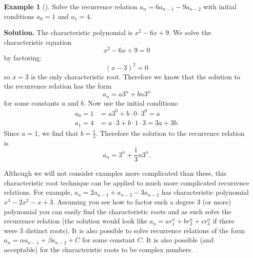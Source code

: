\documentclass[10pt,]{book}
\theoremstyle{plain}
\theoremstyle{definition}
\theoremstyle{definition}
\newtheorem{example}[theorem]{Example}
\theoremstyle{definition}
\theoremstyle{definition}
\numberwithin{equation}{chapter}
\newcommand{\amp}{&}
\begin{document}
\begin{example}[]\label{example-24}
\hypertarget{p-339}{}%
Solve the recurrence relation \(a_n = 6a_{n-1} - 9a_{n-2}\) with initial conditions \(a_0 = 1\) and \(a_1 = 4\).%
\par\smallskip%
\noindent\textbf{Solution.}\hypertarget{solution-38}{}\quad%
\hypertarget{p-340}{}%
The characteristic polynomial is \(x^2 - 6x + 9\). We solve the characteristic equation%
\begin{equation*}
x^2 - 6x + 9 = 0
\end{equation*}
by factoring:%
\begin{equation*}
(x - 3)^2 = 0
\end{equation*}
so \(x =3\) is the only characteristic root. Therefore we know that the solution to the recurrence relation has the form%
\begin{equation*}
a_n = a 3^n + bn3^n
\end{equation*}
for some constants \(a\) and \(b\). Now use the initial conditions:%
\begin{align*}
a_0 = 1 \amp = a 3^0 + b\cdot 0 \cdot 3^0 = a\\
a_1 = 4 \amp = a\cdot 3 + b\cdot 1 \cdot3 = 3a + 3b.
\end{align*}
Since \(a = 1\), we find that \(b = \frac{1}{3}\). Therefore the solution to the recurrence relation is%
\begin{equation*}
a_n = 3^n + \frac{1}{3}n3^n.
\end{equation*}
%
\end{example}
\hypertarget{p-341}{}%
Although we will not consider examples more complicated than these, this characteristic root technique can be applied to much more complicated recurrence relations. For example, \(a_n = 2a_{n-1} + a_{n-2} - 3a_{n-3}\) has characteristic polynomial \(x^3 - 2 x^2 - x + 3\). Assuming you see how to factor such a degree 3 (or more) polynomial you can easily find the characteristic roots and as such solve the recurrence relation (the solution would look like \(a_n = ar_1^n + br_2^n + cr_3^n\) if there were 3 distinct roots). It is also possible to solve recurrence relations of the form \(a_n = \alpha a_{n-1} + \beta a_{n-2} + C\) for some constant \(C\). It is also possible (and acceptable) for the characteristic roots to be complex numbers.%
\typeout{************************************************}
\typeout{************************************************}
\end{document}
